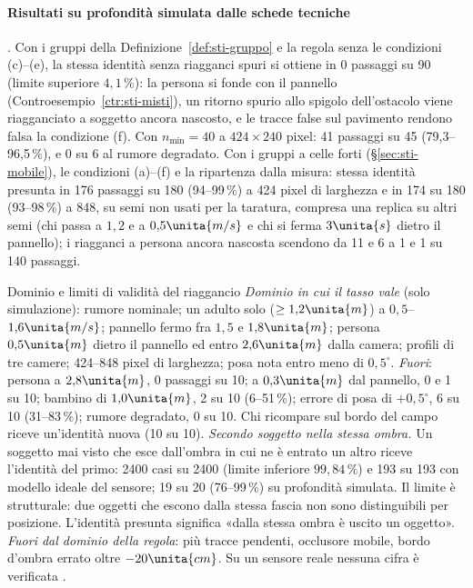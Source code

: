 \paragraph{Risultati su profondità simulata dalle schede tecniche} . Con i gruppi della Definizione~\ref{def:sti-gruppo} e la regola senza le condizioni (c)--(e), la stessa identità senza riagganci spuri si ottiene in 0 passaggi su 90 (limite superiore $4{,}1\,\%$): la persona si fonde con il pannello (Controesempio~\ref{ctr:sti-misti}), un ritorno spurio allo spigolo dell'ostacolo viene riagganciato a soggetto ancora nascosto, e le tracce false sul pavimento rendono falsa la condizione (f). Con $n_{\min}=40$ a $424\times240$ pixel: 41 passaggi su 45 (79,3--96,5\,\%), e 0 su 6 al rumore degradato. Con i gruppi a celle forti (\S\ref{sec:sti-mobile}), le condizioni (a)--(f) e la ripartenza dalla misura: stessa identità presunta in 176 passaggi su 180 (94--99\,\%) a 424 pixel di larghezza e in 174 su 180 (93--98\,\%) a 848, su semi non usati per la taratura, compresa una replica su altri semi (chi passa a $1{,}2$ e a $0{,}5\unita{m/s}$ e chi si ferma $3\unita{s}$ dietro il pannello); i riagganci a persona ancora nascosta scendono da 11 e 6 a 1 e 1 su 140 passaggi.

\begin{riquadro}{Dominio e limiti di validità del riaggancio}
\emph{Dominio in cui il tasso vale} (solo simulazione): rumore nominale; un adulto solo ($\ge1{,}2\unita{m}$) a $0{,}5$--$1{,}6\unita{m/s}$; pannello fermo fra $1{,}5$ e $1{,}8\unita{m}$; persona $0{,}5\unita{m}$ dietro il pannello ed entro $2{,}6\unita{m}$ dalla camera; profili di tre camere; 424--848 pixel di larghezza; posa nota entro meno di $0{,}5^\circ$.
\emph{Fuori}: persona a $2{,}8\unita{m}$, 0 passaggi su 10; a $0{,}3\unita{m}$ dal pannello, 0 e 1 su 10; bambino di $1{,}0\unita{m}$, 2 su 10 (6--51\,\%); errore di posa di $+0{,}5^\circ$, 6 su 10 (31--83\,\%); rumore degradato, 0 su 10. Chi ricompare sul bordo del campo riceve un'identità nuova (10 su 10).
\emph{Secondo soggetto nella stessa ombra.} Un soggetto mai visto che esce dall'ombra in cui ne è entrato un altro riceve l'identità del primo: 2400 casi su 2400 (limite inferiore $99{,}84\,\%$) e 193 su 193 con modello ideale del sensore; 19 su 20 (76--99\,\%) su profondità simulata. Il limite è strutturale: due oggetti che escono dalla stessa fascia non sono distinguibili per posizione. L'identità presunta significa «dalla stessa ombra è uscito un oggetto».
\emph{Fuori dal dominio della regola}: più tracce pendenti, occlusore mobile, bordo d'ombra errato oltre $-20\unita{cm}$. Su un sensore reale nessuna cifra è verificata .
\end{riquadro}
